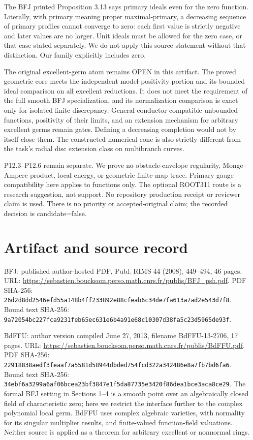 \documentclass[11pt]{article}
\begin{document}
The BFJ printed Proposition 3.13 says primary ideals even for the zero function. Literally, with primary meaning proper maximal-primary, a decreasing sequence of primary profiles cannot converge to zero: each first value is strictly negative and later values are no larger. Unit ideals must be allowed for the zero case, or that case stated separately. We do not apply this source statement without that distinction. Our family explicitly includes zero.

The original excellent-germ atom remains OPEN in this artifact. The proved geometric core meets the independent model-positivity portion and its bounded ideal comparison on all excellent reductions. It does not meet the requirement of the full smooth BFJ specialization, and its normalization comparison is exact only for isolated finite discrepancy. General conductor-compatible unbounded functions, positivity of their limits, and an extension mechanism for arbitrary excellent germs remain gates. Defining a decreasing completion would not by itself close them. The constructed numerical cone is also strictly different from the task's radial disc extension class on multibranch curves.

P12.3--P12.6 remain separate. We prove no obstacle-envelope regularity, Monge--Ampere product, local energy, or geometric finite-map trace. Primary gauge compatibility here applies to functions only. The optional ROOT311 route is a research suggestion, not support. No repository production receipt or reviewer claim is used. There is no priority or accepted-original claim; the recorded decision is candidate=false.

\appendix
\section{Artifact and source record}
\small\raggedright
BFJ: published author-hosted PDF, Publ. RIMS 44 (2008), 449--494,
46 pages. URL: \url{https://sebastien.boucksom.perso.math.cnrs.fr/publis/BFJ_psh.pdf}.
PDF SHA-256:
\texttt{26d2d8dd2546efd55a148b4ff233892e88\allowbreak cfeab6c34de7fa613a7ad2e543d7f8}.
Bound text SHA-256:
\texttt{9a72054bc227fca9231feb65ec631e6b4\allowbreak a91e68c10307d38fa5c23d5965de93f}.

BdFFU: author version compiled June 27, 2013, filename BdFFU-13-2706,
17 pages. URL: \url{https://sebastien.boucksom.perso.math.cnrs.fr/publis/BdFFU.pdf}.
PDF SHA-256:
\texttt{22918838aedf3feaaf7a5581d58944db\allowbreak ded754fcd322a342486e8a7fb7bd6fa6}.
Bound text SHA-256:
\texttt{34ebf6a3299a6af06bcea23bf3847e1f\allowbreak 5da87735e3420f86dea1bce3aca8ce29}.
The formal BFJ setting in Sections 1--4 is a smooth point over an
algebraically closed field of characteristic zero; here we restrict the
interface further to the complex polynomial local germ. BdFFU uses
complex algebraic varieties, with normality for its singular multiplier
results, and finite-valued function-field valuations. Neither source
is applied as a theorem for arbitrary excellent or nonnormal rings.
\end{document}
